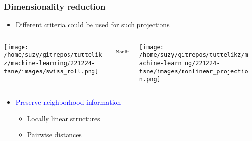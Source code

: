 \documentclass{beamer}
\begin{document}
    \begin{frame}[fragile]
        \frametitle{Dimensionality reduction}
        \begin{itemize}
            \item Different criteria could be used for such projections
        \end{itemize}
        \bigskip
        \begin{columns}
            \begin{column}{0.35\textwidth}
                \texttt{[image: /home/suzy/gitrepos/tuttelikz/machine-learning/221224-tsne/images/swiss\_roll.png]}
            \end{column}
            \begin{column}{0.2\textwidth}
                \begin{center}
                    $\xrightarrow[\text{Nonlinear projection}]{}$    
                \end{center}
                
            \end{column}
            \begin{column}{0.35\textwidth}
                \texttt{[image: /home/suzy/gitrepos/tuttelikz/machine-learning/221224-tsne/images/nonlinear\_projection.png]}
            \end{column}
        \end{columns}
        \bigskip
        \begin{itemize}
            \item \textcolor{blue}{Preserve neighborhood information}
            \begin{itemize}
                \item Locally linear structures
                \item Pairwise distances
            \end{itemize}
        \end{itemize}
        
    \end{frame}
\end{document}
